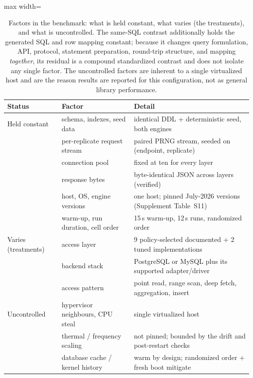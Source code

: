 \begin{table}[htbp]
  \centering
  \caption{Factors in the benchmark: what is held constant, what varies (the
    treatments), and what is uncontrolled. The same-SQL contrast additionally holds
    the generated SQL and row mapping constant; because it changes query
    formulation, API, protocol, statement preparation, round-trip structure, and
    mapping \emph{together}, its residual is a compound standardized contrast and
    does not isolate any single factor. The uncontrolled factors are inherent to a single virtualized
    host and are the reason results are reported for this configuration, not as
    general library performance.}
  \label{tab:factors}
  \begin{adjustbox}{max width=\textwidth}
  \begin{tabular}{l l l}
    \toprule
    Status & Factor & Detail \\
    \midrule
    Held constant & schema, indexes, seed data & identical DDL + deterministic seed, both engines \\
    & per-replicate request stream & paired PRNG stream, seeded on (endpoint, replicate) \\
    & connection pool & fixed at ten for every layer \\
    & response bytes & byte-identical JSON across layers (verified) \\
    & host, OS, engine versions & one host; pinned July-2026 versions (Supplement Table~S11) \\
    & warm-up, run duration, cell order & 15\,s warm-up, 12\,s runs, randomized order \\
    \midrule
    Varies (treatments) & access layer & 9 policy-selected documented + 2 tuned implementations \\
    & backend stack & PostgreSQL or MySQL plus its supported adapter/driver \\
    & access pattern & point read, range scan, deep fetch, aggregation, insert \\
    \midrule
    Uncontrolled & hypervisor neighbours, CPU steal & single virtualized host \\
    & thermal / frequency scaling & not pinned; bounded by the drift and post-restart checks \\
    & database cache / kernel history & warm by design; randomized order + fresh boot mitigate \\
    \bottomrule
  \end{tabular}
  \end{adjustbox}
\end{table}

